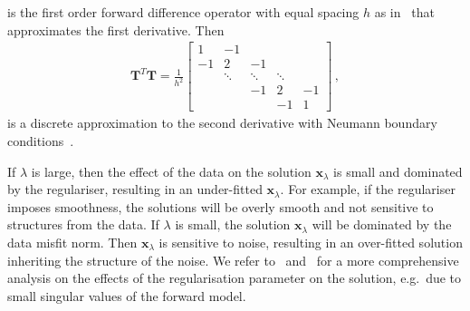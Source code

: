 is the first order forward difference operator with equal spacing $h$ as in~\cite{tan2016LecNot} that approximates the first derivative.
Then 
\begin{align}
	\bm{T}^T\bm{T} = \frac{1}{h^2}
	\begin{bmatrix}
		1 & -1 & & &  \\
		-1 & 2& -1 & &   \\
		& \ddots & \ddots & \ddots &\\ 
		& & -1 & 2 & -1  \\
		& & & -1 & 1 
	\end{bmatrix} \, ,
\label{eq:LaplRegTheo}
\end{align}
is a discrete approximation to the second derivative with Neumann boundary conditions~\cite{wang2015graphs}.

If $\lambda$ is large, then the effect of the data on the solution $\bm{x}_{\lambda}$ is small and dominated by the regulariser, resulting in an under-fitted $\bm{x}_{\lambda}$.
For example, if the regulariser imposes smoothness, the solutions will be overly smooth and not sensitive to structures from the data.
If $\lambda$ is small, the solution $\bm{x}_{\lambda}$ will be dominated by the data misfit norm.
Then $\bm{x}_{\lambda}$ is sensitive to noise, resulting in an over-fitted solution inheriting the structure of the noise.
We refer to~\cite{hansen1989GSVD} and~\cite{tan2016LecNot} for a more comprehensive analysis on the effects of the regularisation parameter on the solution, e.g.~due to small singular values of the forward model.


